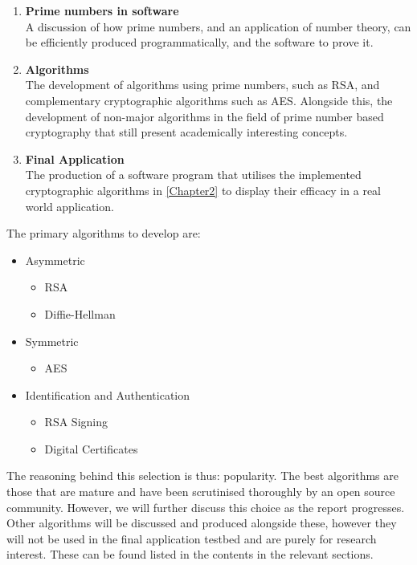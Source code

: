 \begin{enumerate}
	\item \textbf{Prime numbers in software} \\
		A discussion of how prime numbers, and an application of number theory, can be efficiently produced programmatically, and the software to prove it.
	\item \textbf{Algorithms} \\
		The development of algorithms using prime numbers, such as RSA, and complementary cryptographic algorithms such as AES. Alongside this, the development of non-major algorithms in the field of prime number based cryptography that still present academically interesting concepts.
	\item \textbf{Final Application} \\
		The production of a software program that utilises the implemented cryptographic algorithms in \textsection\ref{Chapter2} to display their efficacy in a real world application.
\end{enumerate}

The primary algorithms to develop are:

\begin{itemize}
	\item Asymmetric
		\begin{itemize}
			\item RSA
			\item Diffie-Hellman
		\end{itemize}
	\item Symmetric
		\begin{itemize}
			\item AES
		\end{itemize}
	\item Identification and Authentication
		\begin{itemize}
			\item RSA Signing
			\item Digital Certificates
		\end{itemize}
\end{itemize}

The reasoning behind this selection is thus: popularity. The best algorithms are those that are mature and have been scrutinised thoroughly by an open source community. However, we will further discuss this choice as the report progresses. Other algorithms will be discussed and produced alongside these, however they will not be used in the final application testbed and are purely for research interest. These can be found listed in the contents in the relevant sections.
		
